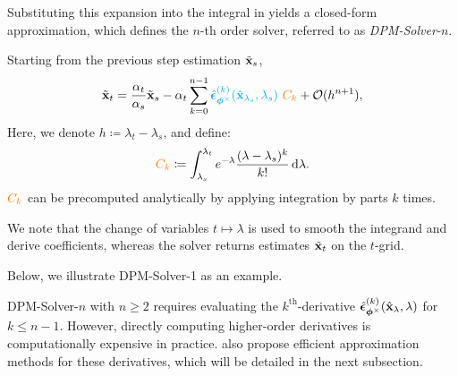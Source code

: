 Substituting this expansion into the integral in  yields a closed-form approximation, which defines the $n$-th order solver, referred to as \emph{DPM-Solver-$n$}.

\begin{mdframed}
Starting from the previous step estimation $\tilde{{\mathbf{x}}}_{s}$,
\begin{equation}
    \label{eq:k-th-expansion}
    \tilde{{\mathbf{x}}}_{t}  =  \frac{\alpha_{t}}{\alpha_{s}} \tilde{{\mathbf{x}}}_{s} - \alpha_{t} \sum_{k=0}^{n-1} {\color{cyan}\hat{\bm{\epsilon}}_{\bm{\phi}^\times}^{(k)}(\hat{{\mathbf{x}}}_{\lambda_{s}},\lambda_{s})} ~{\color{orange}C_k}  + \mathcal{O}(h^{n+1}),
\end{equation}
Here, we denote $h\coloneqq \lambda_{t} - \lambda_{s}$, and define:
\begin{align*}
    {\color{orange}C_k}\coloneqq\int_{\lambda_{s}}^{\lambda_{t}}   e^{-\lambda}  \frac{(\lambda - \lambda_{s})^k}{k!}\mathop{}\!\mathrm{d}\lambda.
\end{align*}
${\color{orange}C_k}$ can be precomputed analytically by applying integration by parts $k$ times.
\end{mdframed}
We note that the change of variables $t \mapsto \lambda$ is used
to smooth the integrand and derive coefficients, whereas the solver
returns estimates $\tilde{{\mathbf{x}}}_{t}$ on the $t$-grid.

Below, we illustrate DPM-Solver-1 as an example.



DPM-Solver-$n$ with $n \geq 2$ requires evaluating the $k^{\text{th}}$-derivative {\color{cyan}$\hat{\bm{\epsilon}}_{\bm{\phi}^\times}^{(k)}(\hat{{\mathbf{x}}}_\lambda, \lambda)$} for $k \leq n-1$. However, directly computing higher-order derivatives is computationally expensive in practice. \citet{lu2022dpm} also propose efficient approximation methods for these derivatives, which will be detailed in the next subsection.

